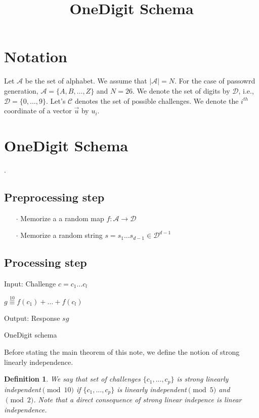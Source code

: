 \documentclass{article}
\title{\LARGE OneDigit Schema}
\author{}
\newtheorem{definition}[theorem]{Definition}
\newenvironment{alg}{
    \begin{list}{}{
        \setlength{\itemsep}{2pt}
        \setlength{\parsep}{0pt}
        \setlength{\parskip}{0pt}
        \setlength{\topsep}{1pt}
    }
}
{
    \end{list}
}
\begin{document}
\maketitle

\section{Notation}
Let $\mathcal{A}$ be the set of alphabet. We assume that $|\mathcal{A}|=N$. For the case of passowrd generation, $\mathcal{A}=\{A,B,\ldots,Z\}$ and $N=26$. We denote the set of digits by $\mathcal{D}$, i.e., $\mathcal{D}=\{0,\ldots,9\}$. Let's $\mathcal{C}$ denotes the set of possible challenges. We denote the $i^{th}$ coordinate of a vector $\vec{u}$ by $u_i$. \section{OneDigit Schema}.

\subsection{Preprocessing step}
\begin{itemize}
	\item[$\cdot$] Memorize a a random map $f:\mathcal{A} \to \mathcal{D}$
	\item[$\cdot$] Memorize a random string $s = s_1 \ldots s_{d-1}\in \mathcal{D}^{d-1}$
\end{itemize}

\subsection{Processing step}

\begin{algorithm}
\label{OneDigit}
\begin{alg}
\item[] Input: Challenge $c=c_1 \ldots c_l$
\item[] $g \overset{10}{\equiv} f(c_1)+\ldots +f(c_l)$
\item[] Output: Response $sg$
\label{alg:NotKnown}
\end{alg}
\caption{OneDigit schema}
\end{algorithm}

Before stating the main theorem of this note, we define the notion of strong linearly independence.

\begin{definition}
We say that set of challenges $\{c_1,\ldots,c_p\}$ is strong linearly independent$\pmod{10}$ if $\{c_1,\ldots,c_p\}$ is linearly independent$\pmod{5}$ and$\pmod{2}$. Note that a direct consequence of strong linear indepence is linear independence.
\end{definition}
                                                                                                            
\end{document}
